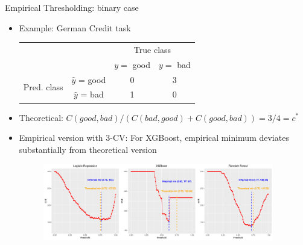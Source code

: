 \documentclass[11pt,compress,t,notes=noshow, xcolor=table]{beamer}
\begin{document}
\begin{vbframe}{Empirical Thresholding: binary case}
    \begin{itemize}
        \item Example: German Credit task
        \footnotesize{
        \begin{center}
                            \begin{tabular}{cc|cc}
        			& &\multicolumn{2}{c}{True class} \\
        			& & $y=$ good & $y=$ bad  \\
        			\hline
        			\multirow{2}{*}{\parbox{0.3cm}{Pred.  class}} & $\hat y$ = good & 0 & 3 \\
        			& $\hat y$ = bad & 1 & 0\\
                \end{tabular}
        \end{center}
        }
        \item Theoretical: $C(good,bad)/(C(bad,good)+C(good,bad))=3/4=c^{*}$ 

        \item Empirical version with 3-CV: For XGBoost, empirical minimum deviates substantially from theoretical version

                \begin{figure}[h]
            \centering
            \includegraphics[width=0.95\textwidth]{slides/imbalanced-learning/figure_man/threshold_plots.pdf}
        \end{figure}

    \end{itemize}
\end{vbframe}
\end{document}
